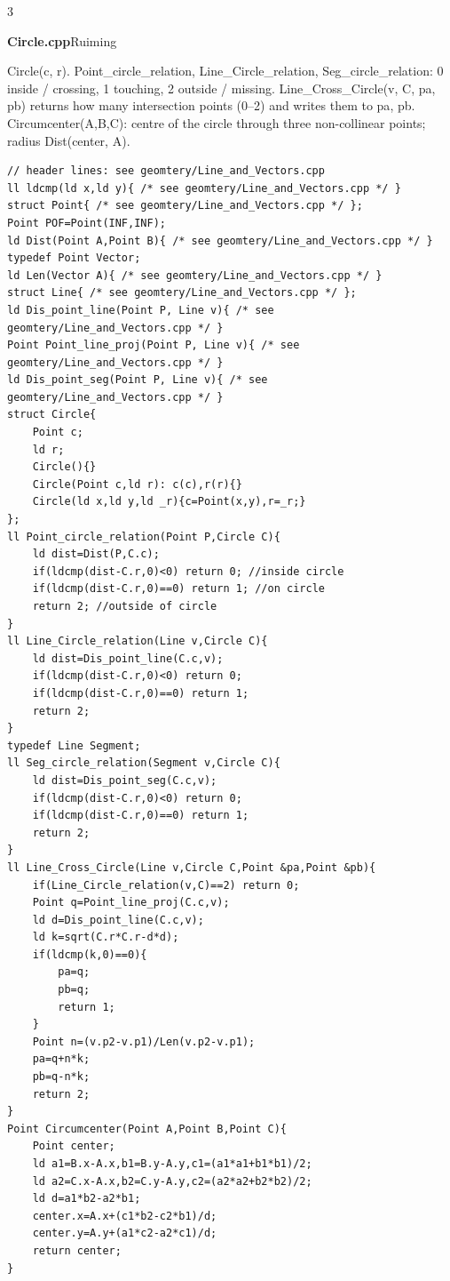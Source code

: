 \documentclass[9pt,a4paper]{extarticle}
\newcommand{\entry}[3]{%
  \addcontentsline{toc}{subsection}{#1}%
  \vspace{0.8ex}%
  \noindent\colorbox{hdbg}{\parbox{\dimexpr\columnwidth-2\fboxsep}{%
    \strut\textbf{#1}\hfill{\footnotesize\textsf{#2}}}}\par
  \vspace{0.4ex}%
  {\footnotesize #3\par}%
}
\newcommand{\code}[1]{{\ttfamily\small #1}}
\begin{document}
\begin{multicols*}{3}
\entry{Circle.cpp}{Ruiming}{\code{Circle(c, r)}. \code{Point\_circle\_relation}, \code{Line\_Circle\_relation}, \code{Seg\_circle\_relation}: 0 inside / crossing, 1 touching, 2 outside / missing. \code{Line\_Cross\_Circle(v, C, pa, pb)} returns how many intersection points (0--2) and writes them to \code{pa}, \code{pb}. \code{Circumcenter(A,B,C)}: centre of the circle through three non-collinear points; radius \code{Dist(center, A)}.}

\begin{lstlisting}[breaklines=true]
// header lines: see geomtery/Line_and_Vectors.cpp
ll ldcmp(ld x,ld y){ /* see geomtery/Line_and_Vectors.cpp */ }
struct Point{ /* see geomtery/Line_and_Vectors.cpp */ };
Point POF=Point(INF,INF);
ld Dist(Point A,Point B){ /* see geomtery/Line_and_Vectors.cpp */ }
typedef Point Vector;
ld Len(Vector A){ /* see geomtery/Line_and_Vectors.cpp */ }
struct Line{ /* see geomtery/Line_and_Vectors.cpp */ };
ld Dis_point_line(Point P, Line v){ /* see geomtery/Line_and_Vectors.cpp */ }
Point Point_line_proj(Point P, Line v){ /* see geomtery/Line_and_Vectors.cpp */ }
ld Dis_point_seg(Point P, Line v){ /* see geomtery/Line_and_Vectors.cpp */ }
struct Circle{
    Point c;
    ld r;
    Circle(){}
    Circle(Point c,ld r): c(c),r(r){}
    Circle(ld x,ld y,ld _r){c=Point(x,y),r=_r;}
};
ll Point_circle_relation(Point P,Circle C){
    ld dist=Dist(P,C.c);
    if(ldcmp(dist-C.r,0)<0) return 0; //inside circle
    if(ldcmp(dist-C.r,0)==0) return 1; //on circle
    return 2; //outside of circle
}
ll Line_Circle_relation(Line v,Circle C){
    ld dist=Dis_point_line(C.c,v);
    if(ldcmp(dist-C.r,0)<0) return 0;
    if(ldcmp(dist-C.r,0)==0) return 1;
    return 2;
}
typedef Line Segment;
ll Seg_circle_relation(Segment v,Circle C){
    ld dist=Dis_point_seg(C.c,v);
    if(ldcmp(dist-C.r,0)<0) return 0;
    if(ldcmp(dist-C.r,0)==0) return 1;
    return 2;
}
ll Line_Cross_Circle(Line v,Circle C,Point &pa,Point &pb){
    if(Line_Circle_relation(v,C)==2) return 0;
    Point q=Point_line_proj(C.c,v);
    ld d=Dis_point_line(C.c,v);
    ld k=sqrt(C.r*C.r-d*d);
    if(ldcmp(k,0)==0){
        pa=q;
        pb=q;
        return 1;
    }
    Point n=(v.p2-v.p1)/Len(v.p2-v.p1);
    pa=q+n*k;
    pb=q-n*k;
    return 2;
}
Point Circumcenter(Point A,Point B,Point C){
    Point center;
    ld a1=B.x-A.x,b1=B.y-A.y,c1=(a1*a1+b1*b1)/2;
    ld a2=C.x-A.x,b2=C.y-A.y,c2=(a2*a2+b2*b2)/2;
    ld d=a1*b2-a2*b1;
    center.x=A.x+(c1*b2-c2*b1)/d;
    center.y=A.y+(a1*c2-a2*c1)/d;
    return center;
}
\end{lstlisting}


\end{multicols*}
\end{document}
